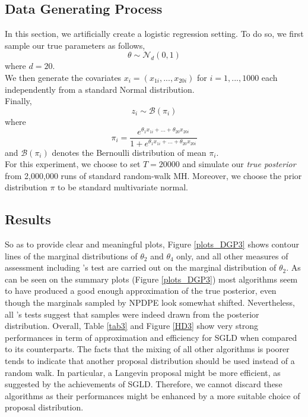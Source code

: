 \documentclass[11pt,a4paper]{report}\usepackage[]{graphicx}\usepackage[]{color}
\begin{document}
\subsection{Data Generating Process}
In this section, we artificially create a logistic regression setting. To do so, we first sample our true parameters as follows,
$$\theta\sim\mathcal N_d(0,1)$$
where $d=20$.\\
We then generate the covariates $x_i=(x_{1i},...,x_{20i})$ for $i=1,...,1000$ each independently from a standard Normal distribution.\\
Finally, $$z_i\sim \mathcal{B}(\pi_i)$$ where $$\pi_i=\frac{e^{\theta_1x_{1i}+...+\theta_{20}x_{20i}}}{1+e^{\theta_1x_{1i}+...+\theta_20x_{20i}}}$$
and $\mathcal{B}(\pi_i)$ denotes the Bernoulli distribution of mean $\pi_i$.\\
For this experiment, we choose to set $T=20000$ and simulate our \textit{true posterior} from 2,000,000 runs of standard random-walk MH. Moreover, we choose the prior distribution $\pi$ to be standard multivariate normal.

\subsection{Results}
So as to provide clear and meaningful plots, Figure \ref{plots_DGP3} shows contour lines of the marginal distributions of $\theta_2$ and $\theta_4$ only, and all other measures of assessment including \cite{geweke2004getting}'s test are carried out on the marginal distribution of $\theta_2$.
As can be seen on the summary plots (Figure \ref{plots_DGP3}) most algorithms seem to have produced a good enough approximation of the true posterior, even though the marginals sampled by NPDPE look somewhat shifted. Nevertheless, all \cite{geweke2004getting}'s tests suggest that samples were indeed drawn from the posterior distribution.  
Overall, Table \ref{tab3} and Figure \ref{HD3} show very strong performances in term of approximation and efficiency for SGLD when compared to its counterparts. The facts that the mixing of all other algorithms is poorer tends to indicate that another proposal distribution should be used instead of a random walk. In particular, a Langevin proposal might be more efficient, as suggested by the achievements of SGLD. Therefore, we cannot discard these algorithms as their performances might be enhanced by a more suitable choice of proposal distribution.
\end{document}
